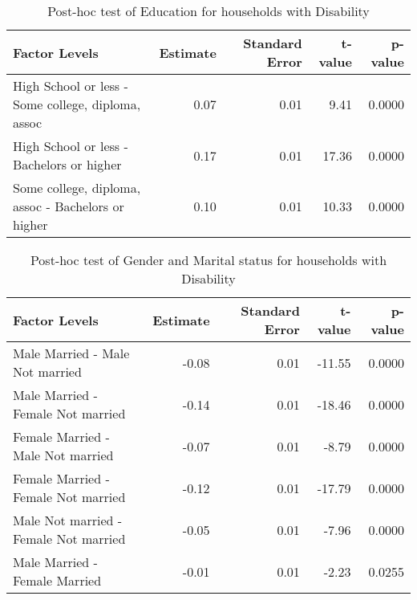 \begin{table}[H]
\footnotesize
\centering
\begin{tabular}{lrrrr}
  \hline
Factor Levels & Estimate & Standard Error & t-value & p-value \\ 
  \hline
 High School or less - Some college, diploma, assoc & 0.07 & 0.01 & 9.41 & 0.0000 \\ 
   High School or less - Bachelors or higher & 0.17 & 0.01 & 17.36 & 0.0000 \\ 
   Some college, diploma, assoc - Bachelors or higher & 0.10 & 0.01 & 10.33 & 0.0000 \\ 
   \hline
\end{tabular}
\caption{Post-hoc test of Education for households with Disability} 
\label{tab:educationDisb}
\end{table}

\begin{table}[H]
\footnotesize
\centering
\begin{tabular}{lrrrr}
  \hline
Factor Levels & Estimate & Standard Error & t-value & p-value \\ 
  \hline
  Male Married -  Male Not married & -0.08 & 0.01 & -11.55 & 0.0000 \\ 
    Male Married -  Female Not married & -0.14 & 0.01 & -18.46 & 0.0000 \\ 
    Female Married -  Male Not married & -0.07 & 0.01 & -8.79 & 0.0000 \\ 
    Female Married -  Female Not married & -0.12 & 0.01 & -17.79 & 0.0000 \\ 
    Male Not married -  Female Not married & -0.05 & 0.01 & -7.96 & 0.0000 \\ 
    Male Married -  Female Married & -0.01 & 0.01 & -2.23 & 0.0255 \\ 
   \hline
\end{tabular}
\caption{Post-hoc test of Gender and Marital status for households with Disability} 
\label{tab:gender:msDisb}
\end{table}

